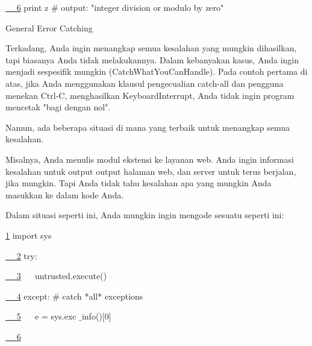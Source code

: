 \documentclass[a4paper,12pt]{report}
\begin{document}
\noindent 
\href{https://wiki.python.org/moin/HandlingExceptions}{~~ 6}
{\fontsize{10pt}{10pt}\selectfont  print z  $  \#  $ output: "integer division or modulo by zero"} \par
\noindent 
\vspace{16pt}
\noindent 
General Error Catching \par
\noindent 
\vspace{12pt}
\noindent 
Terkadang, Anda ingin menangkap semua kesalahan yang mungkin dihasilkan, tapi biasanya Anda tidak melakukannya. Dalam kebanyakan kasus, Anda ingin menjadi sespesifik mungkin (CatchWhatYouCanHandle). Pada contoh pertama di atas, jika Anda menggunakan klausul pengecualian catch-all dan pengguna menekan Ctrl-C, menghasilkan KeyboardInterrupt, Anda tidak ingin program mencetak "bagi dengan nol". \par
\noindent 
\vspace{12pt}
\noindent 
Namun, ada beberapa situasi di mana yang terbaik untuk menangkap semua kesalahan. \par
\noindent 
\vspace{12pt}
\noindent 
Misalnya, Anda menulis modul ekstensi ke layanan web. Anda ingin informasi kesalahan untuk output output halaman web, dan server untuk terus berjalan, jika mungkin. Tapi Anda tidak tahu kesalahan apa yang mungkin Anda masukkan ke dalam kode Anda. \par
\noindent 
\vspace{12pt}
\noindent 
Dalam situasi seperti ini, Anda mungkin ingin mengode sesuatu seperti ini: \par
\vspace{12pt}
\noindent 
\href{https://wiki.python.org/moin/HandlingExceptions}{ 1}
{\fontsize{10pt}{10pt}\selectfont  import sys} \par
\noindent 
\href{https://wiki.python.org/moin/HandlingExceptions}{~~ 2}
{\fontsize{10pt}{10pt}\selectfont  try:} \par
\noindent 
\href{https://wiki.python.org/moin/HandlingExceptions}{~~ 3}
{\fontsize{10pt}{10pt}\selectfont ~~ untrusted.execute()} \par
\noindent 
\href{https://wiki.python.org/moin/HandlingExceptions}{~~ 4}
{\fontsize{10pt}{10pt}\selectfont  except:  $  \#  $ catch *all* exceptions} \par
\noindent 
\href{https://wiki.python.org/moin/HandlingExceptions}{~~ 5}
{\fontsize{10pt}{10pt}\selectfont ~~ e = sys.exc $  \_  $info()[0]} \par
\noindent 
\href{https://wiki.python.org/moin/HandlingExceptions}{~~ 6}
\end{document}
